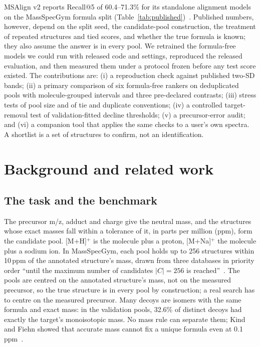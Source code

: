 \documentclass[11pt]{article}
\begin{document}
MSAlign v2 reports Recall@5 of 60.4--71.3\% for its standalone alignment models on the MassSpecGym formula split
(Table~\ref{tab:published})~\citep{krzakala2026msalignv2}. Published numbers, however, depend on
the split seed, the candidate-pool construction, the treatment of repeated structures and tied scores, and whether
the true formula is known; they also assume the answer is in every pool. We retrained the formula-free models we
could run with released code and settings, reproduced the released evaluation, and then measured them under a
protocol frozen before any test score existed. The contributions are: (i) a reproduction check against published
two-SD bands; (ii) a primary comparison of six formula-free rankers on deduplicated pools with molecule-grouped
intervals and three pre-declared contrasts; (iii) stress tests of pool size and of tie and duplicate conventions;
(iv) a controlled target-removal test of validation-fitted decline thresholds; (v) a precursor-error audit; and
(vi) a companion tool that applies the same checks to a user's own spectra. A shortlist is a set of structures to
confirm, not an identification.

\section{Background and related work}\label{sec:background}

\subsection{The task and the benchmark}\label{sec:task}
The precursor m/z, adduct and charge give the neutral mass, and the structures whose exact masses fall within a
tolerance of it, in parts per million (ppm), form the candidate pool. [M+H]$^+$ is the molecule plus a proton,
[M+Na]$^+$ the molecule plus a sodium ion. In MassSpecGym, each pool holds up to 256 structures within 10\,ppm of the
annotated structure's mass, drawn from three databases in priority order ``until the maximum number of candidates
$|C| = 256$ is reached''~\citep{bushuiev2024massspecgym}. The pools are centred on the annotated structure's mass, not
on the measured precursor, so the true structure is in every pool by construction; a real search has to centre on
the measured precursor. Many decoys are isomers with the same formula and exact mass: in the validation pools,
32.6\% of distinct decoys had exactly the target's monoisotopic mass. No mass rule can separate them; Kind and Fiehn
showed that accurate mass cannot fix a unique formula even at 0.1\,ppm~\citep{kind2006}.
\end{document}
